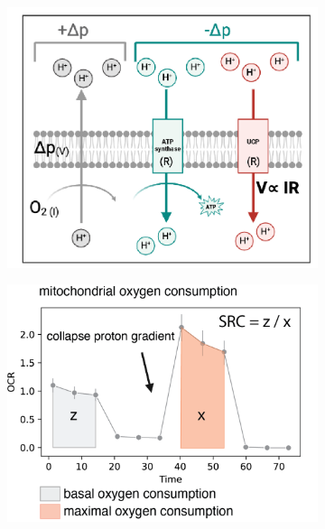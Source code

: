\begin{figure}[H]
\begin{subfigure}[t]{0.33\textwidth}
        \includegraphics[width=\textwidth]{./main_plots/uncoupling_cartoon.png}        
    \end{subfigure}  
    \begin{subfigure}[t]{0.33\textwidth}
        \caption{}
        \includegraphics[width=\textwidth]{./extended_plots/src_cartoon.png}        
    \end{subfigure} 
    \begin{subfigure}[t]{0.33\textwidth}
        \caption{}

\end{subfigure}
\end{figure}
